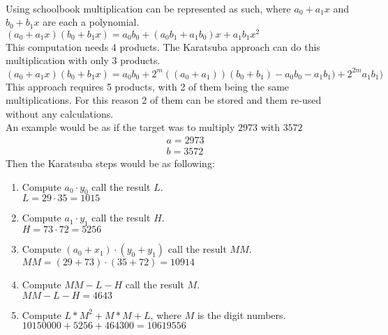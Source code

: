\\
Using schoolbook multiplication can be represented as such, where $a_0 + a_1x$ and $b_0 + b_1x$ are each a polynomial.\\
$(a_0 + a_1 x)(b_0 + b_1 x) = a_0 b_0 + (a_0 b_1 + a_1 b_0 )x + a_1 b_1 x^2$\\
This computation needs 4 products. The Karatsuba approach can do this multiplication with only 3 products.\\
$(a_0 + a_1 x)(b_0 + b_1 x) = a_0 b_0 + 2^m ((a_0+a_1))(b_0 + b_1)-a_0 b_0 - a_1 b_1) + 2^{2m} a_1 b_1)$\\
This approach requires 5 products, with 2 of them being the same multiplications. For this reason 2 of them can be stored and them re-used without any calculations.\medskip
\\
An example would be as if the target was to multiply $2973$ with $3572$ \\
\begin{equation*}
    \begin{split}
        & a = 2973\\
        & b = 3572
    \end{split}
\end{equation*}
Then the Karatsuba steps would be as following:
\begin{enumerate}
    \item Compute $a_0 \cdot y_0$ call the result $L$.\\$L = 29 \cdot 35 = 1015$
    \item Compute $a_1 \cdot y_1$ call the result $H$.\\$H = 73 \cdot 72 = 5256$
    \item Compute $(a_0 + x_1) \cdot (y_0 + y_1)$ call the result $MM$.\\$MM = (29 + 73) \cdot (35 + 72) = 10914$
    \item Compute $MM - L - H$ call the result $M$.\\$MM - L - H = 4643$
    \item Compute $L * M^2 + M * M + L$, where $M$ is the digit numbers.\\$10150000 + 5256 + 464300 = 10619556$
\end{enumerate}
